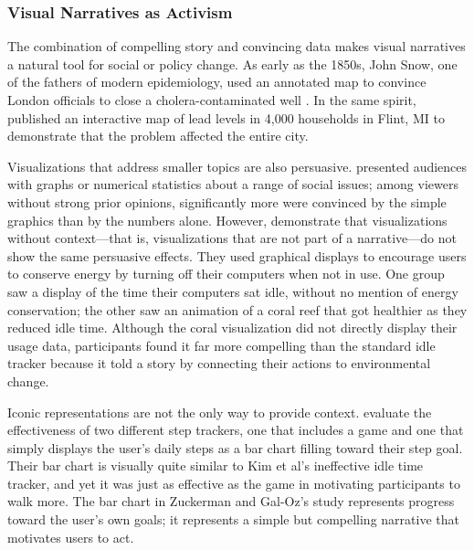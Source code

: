 \subsubsection{Visual Narratives as Activism}
The combination of compelling story and convincing data makes visual narratives a natural tool for social or policy change. As early as the 1850s, John Snow, one of the fathers of modern epidemiology, used an annotated map to convince London officials to close a cholera-contaminated well \citep{Johnson2006Ghost}. In the same spirit, \citet{MichiganPublicRadio2016MAP} published an interactive map of lead levels in 4,000 households in Flint, MI to demonstrate that the problem affected the entire city.

Visualizations that address smaller topics are also persuasive. \citet{PandeyEtAl2014Persuasive} presented audiences with graphs or numerical statistics about a range of social issues; among viewers without strong prior opinions, significantly more were convinced by the simple graphics than by the numbers alone. However, \citet{KimEtAl2010Designing} demonstrate that visualizations without context---that is, visualizations that are not part of a narrative---do not show the same persuasive effects. They used graphical displays to encourage users to conserve energy by turning off their computers when not in use. One group saw a display of the time their computers sat idle, without no mention of energy conservation; the other saw an animation of a coral reef that got healthier as they reduced idle time. Although the coral visualization did not directly display their usage data, participants found it far more compelling than the standard idle tracker because it told a story by connecting their actions to environmental change.

Iconic representations are not the only way to provide context. \citet{ZuckermanGalOz2014Deconstructing} evaluate the effectiveness of two different step trackers, one that includes a game and one that simply displays the user's daily steps as a bar chart filling toward their step goal. Their bar chart is visually quite similar to Kim et al's ineffective idle time tracker, and yet it was just as effective as the game in motivating participants to walk more. The bar chart in Zuckerman and Gal-Oz's study represents progress toward the user's own goals; it represents a simple but compelling narrative that motivates users to act.

